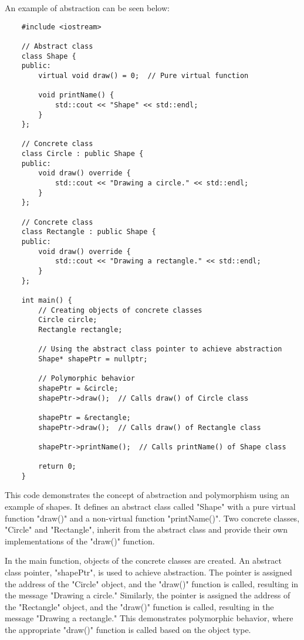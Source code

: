\begin{solution}
    An example of abstraction can be seen below: \\
    \horizontalline
    \begin{verbatim}
    #include <iostream>

    // Abstract class
    class Shape {
    public:
        virtual void draw() = 0;  // Pure virtual function
        
        void printName() {
            std::cout << "Shape" << std::endl;
        }
    };

    // Concrete class
    class Circle : public Shape {
    public:
        void draw() override {
            std::cout << "Drawing a circle." << std::endl;
        }
    };

    // Concrete class
    class Rectangle : public Shape {
    public:
        void draw() override {
            std::cout << "Drawing a rectangle." << std::endl;
        }
    };

    int main() {
        // Creating objects of concrete classes
        Circle circle;
        Rectangle rectangle;
        
        // Using the abstract class pointer to achieve abstraction
        Shape* shapePtr = nullptr;
        
        // Polymorphic behavior
        shapePtr = &circle;
        shapePtr->draw();  // Calls draw() of Circle class
        
        shapePtr = &rectangle;
        shapePtr->draw();  // Calls draw() of Rectangle class
        
        shapePtr->printName();  // Calls printName() of Shape class
        
        return 0;
    }
    \end{verbatim}
    
    \horizontalline

    This code demonstrates the concept of abstraction and polymorphism using an example of shapes. It defines an abstract class called "Shape" with a pure virtual function "draw()" and a non-virtual function "printName()". Two concrete classes, 
    "Circle" and "Rectangle", inherit from the abstract class and provide their own implementations of the "draw()" function.

    \noindent In the main function, objects of the concrete classes are created. An abstract class pointer, "shapePtr", is used to achieve abstraction. The pointer is assigned the address of the "Circle" object, and the "draw()" function is called, resulting
    in the message "Drawing a circle." Similarly, the pointer is assigned the address of the "Rectangle" object, and the "draw()" function is called, resulting in the message "Drawing a rectangle." This demonstrates polymorphic behavior, where the
    appropriate "draw()" function is called based on the object type.


\end{solution}
